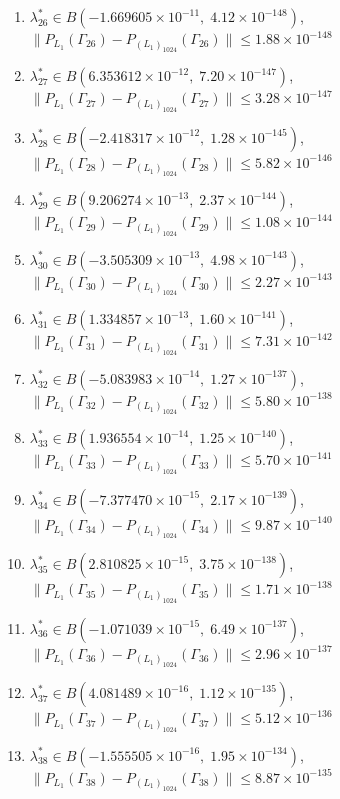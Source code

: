 \begin{enumerate}
\item $\lambda_{26}^* \in B(-1.669605 \times 10^{-11},\; 4.12 \times 10^{-148})$, \quad $\|P_{L_1}(\Gamma_{26}) - P_{(L_1)_{1024}}(\Gamma_{26})\| \leq 1.88 \times 10^{-148}$
\item $\lambda_{27}^* \in B(6.353612 \times 10^{-12},\; 7.20 \times 10^{-147})$, \quad $\|P_{L_1}(\Gamma_{27}) - P_{(L_1)_{1024}}(\Gamma_{27})\| \leq 3.28 \times 10^{-147}$
\item $\lambda_{28}^* \in B(-2.418317 \times 10^{-12},\; 1.28 \times 10^{-145})$, \quad $\|P_{L_1}(\Gamma_{28}) - P_{(L_1)_{1024}}(\Gamma_{28})\| \leq 5.82 \times 10^{-146}$
\item $\lambda_{29}^* \in B(9.206274 \times 10^{-13},\; 2.37 \times 10^{-144})$, \quad $\|P_{L_1}(\Gamma_{29}) - P_{(L_1)_{1024}}(\Gamma_{29})\| \leq 1.08 \times 10^{-144}$
\item $\lambda_{30}^* \in B(-3.505309 \times 10^{-13},\; 4.98 \times 10^{-143})$, \quad $\|P_{L_1}(\Gamma_{30}) - P_{(L_1)_{1024}}(\Gamma_{30})\| \leq 2.27 \times 10^{-143}$
\item $\lambda_{31}^* \in B(1.334857 \times 10^{-13},\; 1.60 \times 10^{-141})$, \quad $\|P_{L_1}(\Gamma_{31}) - P_{(L_1)_{1024}}(\Gamma_{31})\| \leq 7.31 \times 10^{-142}$
\item $\lambda_{32}^* \in B(-5.083983 \times 10^{-14},\; 1.27 \times 10^{-137})$, \quad $\|P_{L_1}(\Gamma_{32}) - P_{(L_1)_{1024}}(\Gamma_{32})\| \leq 5.80 \times 10^{-138}$
\item $\lambda_{33}^* \in B(1.936554 \times 10^{-14},\; 1.25 \times 10^{-140})$, \quad $\|P_{L_1}(\Gamma_{33}) - P_{(L_1)_{1024}}(\Gamma_{33})\| \leq 5.70 \times 10^{-141}$
\item $\lambda_{34}^* \in B(-7.377470 \times 10^{-15},\; 2.17 \times 10^{-139})$, \quad $\|P_{L_1}(\Gamma_{34}) - P_{(L_1)_{1024}}(\Gamma_{34})\| \leq 9.87 \times 10^{-140}$
\item $\lambda_{35}^* \in B(2.810825 \times 10^{-15},\; 3.75 \times 10^{-138})$, \quad $\|P_{L_1}(\Gamma_{35}) - P_{(L_1)_{1024}}(\Gamma_{35})\| \leq 1.71 \times 10^{-138}$
\item $\lambda_{36}^* \in B(-1.071039 \times 10^{-15},\; 6.49 \times 10^{-137})$, \quad $\|P_{L_1}(\Gamma_{36}) - P_{(L_1)_{1024}}(\Gamma_{36})\| \leq 2.96 \times 10^{-137}$
\item $\lambda_{37}^* \in B(4.081489 \times 10^{-16},\; 1.12 \times 10^{-135})$, \quad $\|P_{L_1}(\Gamma_{37}) - P_{(L_1)_{1024}}(\Gamma_{37})\| \leq 5.12 \times 10^{-136}$
\item $\lambda_{38}^* \in B(-1.555505 \times 10^{-16},\; 1.95 \times 10^{-134})$, \quad $\|P_{L_1}(\Gamma_{38}) - P_{(L_1)_{1024}}(\Gamma_{38})\| \leq 8.87 \times 10^{-135}$

\end{enumerate}

